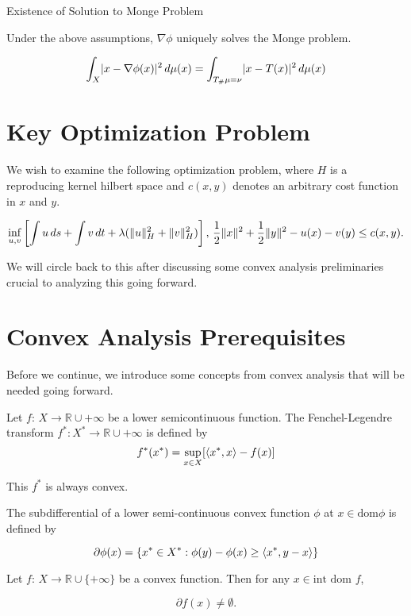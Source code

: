 \begin{corollary}{Existence of Solution to Monge Problem}
	
Under the above assumptions, $\nabla \phi$ uniquely solves the Monge problem.

\[
\int_X \abs{x-\nabla\phi(x)}^2\,d\mu(x) = \int_{T_{\#}\mu=\nu}\abs{x-T(x)}^2\,d\mu(x)
\]
	
\end{corollary}

\section*{Key Optimization Problem}

We wish to examine the following optimization problem, where $H$ is a reproducing kernel hilbert space and $c(x,y)$ denotes an arbitrary cost function in $x$ and $y$.

$$ \inf_{u,v} \left[ \int u \, ds + \int v \, dt + \lambda (\norm{u}_H^2 + \norm{v}_H^2)\right],\, \frac{1}{2}\norm{x}^2 + \frac{1}{2}\norm{y}^2 - u(x) - v(y)\leq c(x,y). $$

We will circle back to this after discussing some convex analysis preliminaries crucial to analyzing this going forward.

\section{Convex Analysis Prerequisites}

Before we continue, we introduce some concepts from convex analysis that will be needed going forward.

\begin{definition}
	Let $f:\,X\to \mathbb{R}\cup +\infty$ be a lower semicontinuous function. The Fenchel-Legendre transform $f^{*}: X^{*}\to \mathbb{R}\cup +\infty$ is defined by
	$$
	f^{*}(x^{*}) = \sup_{x\in X} [\ang*{x^{*},x}-f(x)]
	$$
	
	This $f^{*}$ is always convex.
\end{definition}

\begin{definition}
	The subdifferential of a lower semi-continuous convex function $\phi$ at $x\in \textrm{dom} \phi$ is defined by
	
	$$
	\partial \phi(x) = \{ x^{*}\in X^{*}: \phi(y)-\phi(x)\geq \ang*{x^{*},y-x} \}
	$$
\end{definition}

\begin{corollary}
	Let $f:\,X\to \mathbb{R}\cup \{+\infty\}$ be a convex function. Then for any $x\in \textrm{int dom }f$,
	
	$$ \partial f(x)\neq \emptyset.$$
\end{corollary}

